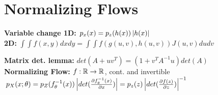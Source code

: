 \section{Normalizing Flows}

\textbf{Variable change 1D:} $p_x(x) = p_z(h(x)) \left\lvert h(x) \right\rvert$\\
\textbf{2D:} $\int \int f(x,y) dxdy = \int \int f(g(u,v), h(u,v)) J(u,v) dudv$\\

\textbf{Matrix det. lemma:} $det(A + uv^T) = (1 + v^T A^{-1} u) det(A)$\\

\textbf{Normalizing Flow:} $f: \mathbb{R} \rightarrow \mathbb{R}$, cont. and invertible\\
$p_X(x; \theta) = p_Z(f_\theta^{-1}(x)) \left\lvert det(\frac{\partial f_\theta^{-1}(x)}{\partial x}) \right\rvert
= p_z(z) \left\lvert det(\frac{\partial f(z)}{\partial z}) \right\rvert^{-1}$\\

